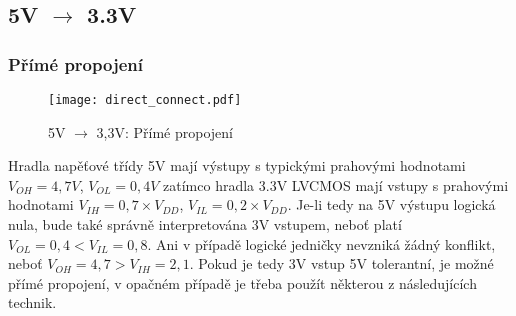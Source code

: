 {    %
    \subsection{5V $\rightarrow$ 3.3V} %
      \subsubsection{Přímé propojení}
        \begin{figure}[ht!]
            \centering
            \texttt{[image: direct\_connect.pdf]}
            \caption{5V $\rightarrow$ 3,3V: Přímé propojení}
            \label{CES:fig_dir_connect}
        \end{figure}

        Hradla napěťové třídy 5V mají výstupy s typickými prahovými hodnotami $V_{OH} = 4,7 V$,
        $V_{OL} = 0,4 V$ zatímco hradla 3.3V LVCMOS mají vstupy s prahovými hodnotami $V_{IH} =
        0,7\times V_{DD} $, $V_{IL} = 0,2\times V_{DD}$. Je-li tedy na 5V výstupu logická nula,
        bude také správně interpretována 3V vstupem, neboť platí $V_{OL} = 0,4 < V_{IL} = 0,8$. Ani
        v případě logické jedničky nevzniká žádný konflikt, neboť $V_{OH} = 4,7 > V_{IH} = 2,1$.
        Pokud je tedy 3V vstup 5V tolerantní, je možné přímé propojení, v opačném případě je třeba
        použít některou z následujících technik.

}

